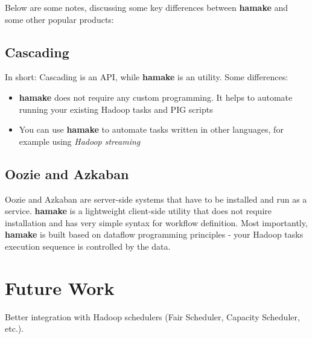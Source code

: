 \documentclass{article}
\begin{document}
Below are some notes, discussing some key differences between \textbf{hamake}
and some other popular products:

\subsection*{Cascading}

In short: Cascading is an API, while \textbf{hamake} is an utility. Some differences:
\begin{itemize}
\item \textbf{hamake} does not require any custom programming. It helps to automate running your existing Hadoop tasks and PIG scripts
\item You can use \textbf{hamake} to automate tasks written in other languages, for example using \textit{Hadoop streaming}
\end{itemize}

\subsection*{Oozie and Azkaban}

Oozie and Azkaban are server-side systems that have to be installed
and run as a service. \textbf{hamake} is a lightweight client-side utility that
does not require installation and has very simple syntax for workflow
definition.  Most importantly, \textbf{hamake} is built based on dataflow
programming principles - your Hadoop tasks execution sequence is
controlled by the data.
 

\section{Future Work}

Better integration with Hadoop schedulers (Fair Scheduler, Capacity
Scheduler, etc.).

\nocite{*}


\end{document}

